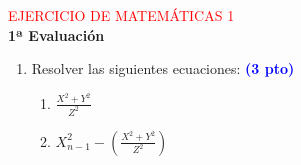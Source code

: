 \documentclass[10pt,a4paper]{article}
\begin{document}
\begin{center}
\textcolor{red}{EJERCICIO DE MATEMÁTICAS 1}\\
\bigskip
\bf{1ª Evaluación}
\end{center}
\bigskip

\begin{enumerate}
\item Resolver las siguientes ecuaciones:	\textcolor{blue}{\bf{(3 pto)}}
\begin{enumerate}
\item $\frac{X^2+Y^2}{Z^2}$
\item $X^2_{n-1}-(\frac{X^2+Y^2}{Z^2})$
\end{enumerate}
\end{enumerate}
\end{document}
